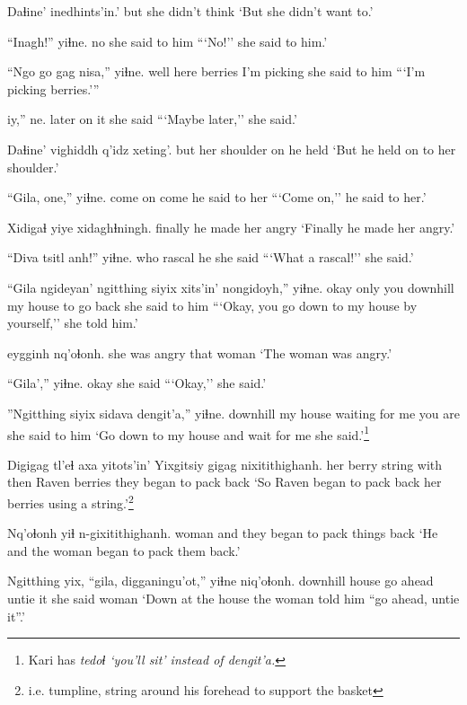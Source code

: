 \documentclass[12pt]{article}
\begin{document}
\gll Daɬine' inedhints'in.'
but  {she didn't think}
\glt `But she didn't want to.'
\glend

\gll ``Inagh!'' yiɬne.
no  {she said to him}
\glt ```No!'' she said to him.'
\glend

\gll ``Ngo go gag  nisa,'' yiɬne.
well here berries {I'm picking} {she said to him}
\glt ```I'm picking berries.'''
\glend

 iy,'' ne.
{later on} it {she said}
\glt ```Maybe later,'' she said.'
\glend

\gll Daɬine' vighiddh q'idz xeting'.
but  {her shoulder} on {he held}
\glt `But he held on to her shoulder.'
\glend

\gll ``Gila, one,'' yiɬne.
{come on} come {he said to her}
\glt ```Come on,'' he said to her.'
\glend

\gll Xidigaɬ {yiye xidaghɬningh.}
finally  {he made her angry}
\glt `Finally he made her angry.'
\glend

\gll ``Diva tsitl anh!'' yiɬne.
who rascal he {she said}
\glt ```What a rascal!'' she said.'
\glend

\gll ``Gila ngideyan' ngitthing siyix  xits'in' nongidoyh,'' yiɬne.
okay {only you} downhill  {my house} to  {go back}  {she said to him}
\glt ```Okay, you go down to my house by yourself,'' she told him.'
\glend

 eygginh nq'oɬonh.
{she was angry} that  woman
\glt `The woman was angry.'
\glend

\gll ``Gila','' yiɬne.
okay  {she said}
\glt ```Okay,'' she said.'
\glend

\gll ''Ngitthing siyix  sidava dengit'a,''  yiɬne.
downhill  {my house} {waiting for me} {you are} {she said to him}
\glt `Go down to my house and wait for me she said.'\footnote{Kari has \em tedoɬ \em `you'll sit' instead of \em dengit'a.}
\glend

\gll Digigag tl'eɬ axa yitots'in' Yixgitsiy gigag  nixitithighanh.
{her berry} string with then Raven  berries  {they began to pack back}
\glt `So Raven began to pack back her berries using a string.'\footnote{i.e. tumpline, string around his forehead to support the basket}
\glend

\gll Nq'oɬonh yiɬ n-gixitithighanh.
woman  and {they began to pack things back}
\glt `He and the woman began to pack them back.'
\glend

\gll Ngitthing yix, ``gila, digganingu'ot,'' yiɬne  niq'oɬonh.
downhill  house {go ahead} {untie it}   {she said} woman
\glt `Down at the house the woman told him ``go ahead, untie it''.'
\glend
\end{document}
